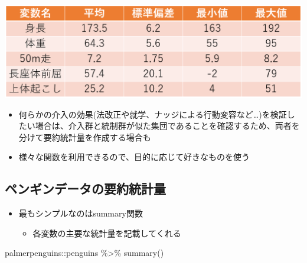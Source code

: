 \documentclass[
]{ltjsarticle}
\newenvironment{Shaded}{\begin{snugshade}}{\end{snugshade}}
\newcommand{\FunctionTok}[1]{\textcolor[rgb]{0.00,0.00,0.00}{#1}}
\newcommand{\NormalTok}[1]{#1}
\newcommand{\SpecialCharTok}[1]{\textcolor[rgb]{0.00,0.00,0.00}{#1}}
\providecommand{\tightlist}{%
  \setlength{\itemsep}{0pt}\setlength{\parskip}{0pt}}
\begin{document}
\begin{center}\includegraphics[width=0.8\linewidth]{figs/summary_ex} \end{center}

\begin{itemize}
\tightlist
\item
  何らかの介入の効果(法改正や就学、ナッジによる行動変容など\ldots)を検証したい場合は、介入群と統制群が似た集団であることを確認するため、両者を分けて要約統計量を作成する場合も
\item
  様々な関数を利用できるので、目的に応じて好きなものを使う
\end{itemize}

\hypertarget{ux30daux30f3ux30aeux30f3ux30c7ux30fcux30bfux306eux8981ux7d04ux7d71ux8a08ux91cf}{%
\subsection{ペンギンデータの要約統計量}\label{ux30daux30f3ux30aeux30f3ux30c7ux30fcux30bfux306eux8981ux7d04ux7d71ux8a08ux91cf}}

\begin{itemize}
\tightlist
\item
  最もシンプルなのはsummary関数

  \begin{itemize}
  \tightlist
  \item
    各変数の主要な統計量を記載してくれる
  \end{itemize}
\end{itemize}

\begin{Shaded}
\begin{Highlighting}[]
\NormalTok{palmerpenguins}\SpecialCharTok{::}\NormalTok{penguins }\SpecialCharTok{\%\textgreater{}\%}
  \FunctionTok{summary}\NormalTok{()}
\end{Highlighting}
\end{Shaded}
\end{document}
